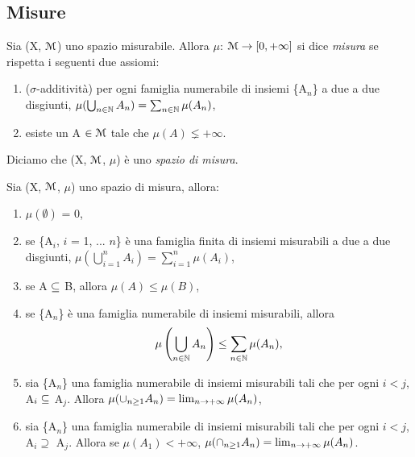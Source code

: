 \documentclass[Completo.tex]{subfiles}
\begin{document}
\subsection{Misure}
\begin{Def}
	Sia (X, $\eu[M]$) uno spazio misurabile. Allora $\mu$: $\eu[M] \ra [0, +\infty]$ si dice \textit{misura} se rispetta i seguenti due assiomi:
	\begin{enumerate}
		\item ($\sigma$-additività) per ogni famiglia numerabile di insiemi \{A$_n$\} a due a due disgiunti, $\mu(\bigcup_{n \in \bb[N]} A_n) = \sum_{n \in \bb[N]} \mu(A_n)$,
		\item esiste un A $\in \eu[M]$ tale che $\mu(A) \lneq +\infty$.
	\end{enumerate}
Diciamo che (X, $\eu[M]$, $\mu$) è uno \textit{spazio di misura}.
\end{Def}
\begin{eTh}
	Sia (X, $\eu[M]$, $\mu$) uno spazio di misura, allora:
	\begin{enumerate}
		\item $\mu(\emptyset)$ = 0,
		\item se \{A$_i$, $i$ = 1, ... $n$\} è una famiglia finita di insiemi  misurabili a due a due disgiunti,  $\mu(\bigcup_{i=1}^{n} A_i) = \sum_{i =1}^{n} \mu(A_i)$,
		\item se A $\subseteq$ B, allora $\mu(A) \leq \mu(B)$,
		\item se \{A$_n$\} è una famiglia numerabile di insiemi misurabili, allora
		\begin{equation*}
			\mu\left(\bigcup_{n \in \bb[N]} A_n\right) \leq \sum_{n \in \bb[N]} \mu(A_n),
		\end{equation*}
		\item sia \{A$_n$\} una famiglia numerabile di insiemi misurabili tali che per ogni $i < j$, A$_i \subseteq$ A$_j$. Allora $\mu(\cup_{n\geq1}A_n) = \lim_{n \rightarrow +\infty} \mu(A_n)$,
		\item sia \{A$_n$\} una famiglia numerabile di insiemi misurabili tali che per ogni $i < j$, A$_i \supseteq$ A$_j$. Allora se $\mu(A_1) < +\infty$, $\mu(\cap_{n\geq1}A_n) = \lim_{n \rightarrow +\infty} \mu(A_n)$.
	\end{enumerate}
\end{eTh}
\end{document}
